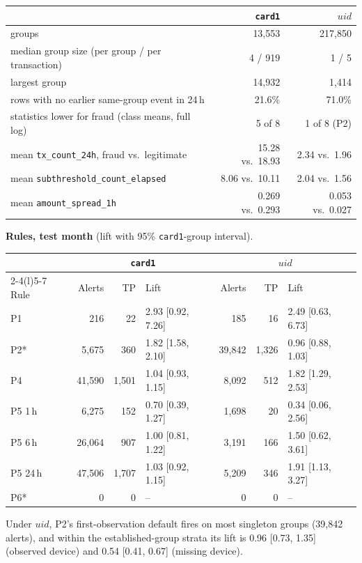 \documentclass[10pt]{article}
\newcommand{\tf}[1]{\texttt{#1}}
\begin{document}
\begin{center}\footnotesize
\begin{tabular}{@{}lrr@{}}
\toprule
 & \tf{card1} & $\mathit{uid}$ \\
\midrule
groups & 13,553 & 217,850 \\
median group size (per group / per transaction) & 4 / 919 & 1 / 5 \\
largest group & 14,932 & 1,414 \\
rows with no earlier same-group event in 24\,h & 21.6\% & 71.0\% \\
statistics lower for fraud (class means, full log) & 5 of 8 & 1 of 8 (P2) \\
mean \tf{tx\_count\_24h}, fraud vs.\ legitimate & 15.28 vs.\ 18.93 & 2.34 vs.\ 1.96 \\
mean \tf{subthreshold\_count\_elapsed} & 8.06 vs.\ 10.11 & 2.04 vs.\ 1.56 \\
mean \tf{amount\_spread\_1h} & 0.269 vs.\ 0.293 & 0.053 vs.\ 0.027 \\
\bottomrule
\end{tabular}\end{center}

\textbf{Rules, test month} (lift with 95\% \tf{card1}-group interval).
\begin{center}\footnotesize
\begin{tabular}{@{}lrrlrrl@{}}
\toprule
 & \multicolumn{3}{c}{\tf{card1}} & \multicolumn{3}{c}{$\mathit{uid}$} \\
\cmidrule(lr){2-4}\cmidrule(l){5-7}
Rule & Alerts & TP & Lift & Alerts & TP & Lift \\
\midrule
P1 & 216 & 22 & 2.93 [0.92, 7.26] & 185 & 16 & 2.49 [0.63, 6.73] \\
P2* & 5,675 & 360 & 1.82 [1.58, 2.10] & 39,842 & 1,326 & 0.96 [0.88, 1.03] \\
P4 & 41,590 & 1,501 & 1.04 [0.93, 1.15] & 8,092 & 512 & 1.82 [1.29, 2.53] \\
P5 1\,h & 6,275 & 152 & 0.70 [0.39, 1.27] & 1,698 & 20 & 0.34 [0.06, 2.56] \\
P5 6\,h & 26,064 & 907 & 1.00 [0.81, 1.22] & 3,191 & 166 & 1.50 [0.62, 3.61] \\
P5 24\,h & 47,506 & 1,707 & 1.03 [0.92, 1.15] & 5,209 & 346 & 1.91 [1.13, 3.27] \\
P6* & 0 & 0 & -- & 0 & 0 & -- \\
\bottomrule
\end{tabular}\end{center}
Under $\mathit{uid}$, P2's first-observation default fires on most singleton groups (39,842 alerts), and within the established-group strata its lift is 0.96 [0.73, 1.35] (observed device) and 0.54 [0.41, 0.67] (missing device).
\end{document}
